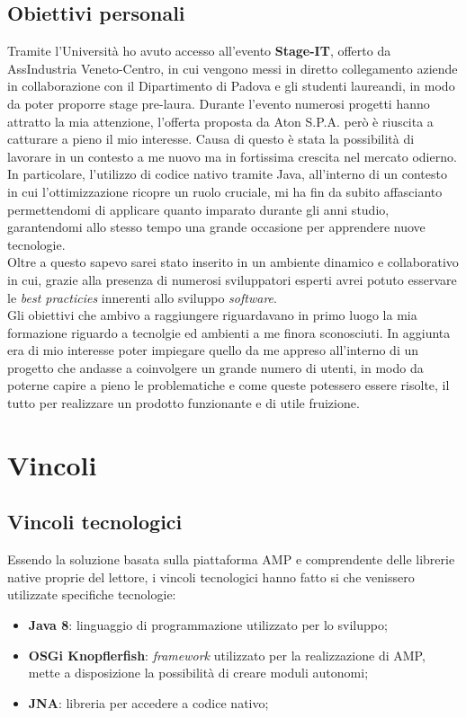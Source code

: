 \subsection{Obiettivi personali}
Tramite l'Università ho avuto accesso all'evento \textbf{Stage-IT}, offerto da AssIndustria Veneto-Centro, in cui vengono messi in diretto collegamento aziende in collaborazione con
il Dipartimento di Padova e gli studenti laureandi, in modo da poter proporre stage pre-laura.
Durante l'evento numerosi progetti hanno attratto la mia attenzione, l'offerta proposta da Aton S.P.A. però è riuscita a catturare a pieno il mio interesse.
Causa di questo è stata la possibilità di lavorare in un contesto a me nuovo ma in fortissima crescita nel mercato odierno. In particolare, l'utilizzo di codice nativo
tramite Java, all'interno di un contesto in cui l'ottimizzazione ricopre un ruolo cruciale, mi ha fin da subito affascianto permettendomi di
applicare quanto imparato durante gli anni studio, garantendomi allo stesso tempo una grande occasione per apprendere nuove tecnologie. \\
Oltre a questo sapevo sarei stato inserito in un ambiente dinamico e collaborativo in cui, grazie alla presenza di numerosi sviluppatori esperti avrei potuto esservare
le \emph{best practicies} innerenti allo sviluppo \emph{software}. \\
Gli obiettivi che ambivo a raggiungere riguardavano in primo luogo la mia formazione riguardo a tecnolgie ed ambienti a me finora sconosciuti. In aggiunta era di mio interesse
poter impiegare quello da me appreso all'interno di un progetto che andasse a coinvolgere un grande numero di utenti, in modo da poterne capire a pieno le problematiche e
come queste potessero essere risolte, il tutto per realizzare un prodotto funzionante e di utile fruizione.


\section{Vincoli}
\subsection{Vincoli tecnologici}
Essendo la soluzione basata sulla piattaforma AMP e comprendente delle librerie native proprie del lettore, i vincoli tecnologici hanno fatto si che venissero utilizzate specifiche tecnologie:
\begin{itemize}
    \item \textbf{Java 8}: linguaggio di programmazione utilizzato per lo sviluppo;
    \item \textbf{OSGi Knopflerfish}: \emph{framework} utilizzato per la realizzazione di AMP, mette a disposizione la possibilità di creare moduli autonomi;
    \item \textbf{JNA}: libreria per accedere a codice nativo;
\end{itemize}

